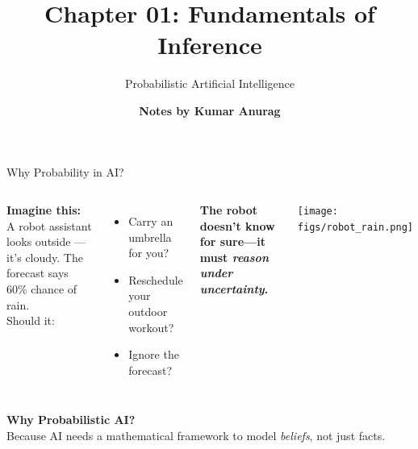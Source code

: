 \documentclass[handout,aspectratio=169]{beamer}
\title{
Chapter 01: Fundamentals of Inference
}
\author{\bf Notes by Kumar Anurag}
\date{}
\subtitle{
Probabilistic Artificial Intelligence
}
\begin{document}
{
	\begin{frame}
		\maketitle
	\end{frame}}



\begin{frame}{Why Probability in AI?}
	\begin{columns}
		\textbf{Imagine this:}\\[0.3em]
		A robot assistant looks outside — it's cloudy.  
		The forecast says 60\% chance of rain.\\[0.8em]
		Should it:\\
		\begin{itemize}
			\item Carry an umbrella for you?
			\item Reschedule your outdoor workout?
			\item Ignore the forecast?
		\end{itemize}
		
		\vspace{0.5em}
		\textbf{The robot doesn’t know for sure—it must \textit{reason under uncertainty}.}
		    
		\texttt{[image: figs/robot\_rain.png]}
	\end{columns}
	
	\vspace{1em}
	\textbf{Why Probabilistic AI?} \\
	Because AI needs a mathematical framework to model \textit{beliefs}, not just facts.
\end{frame}
\end{document}
